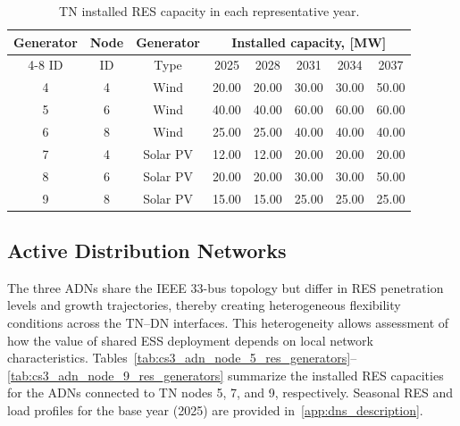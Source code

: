 \documentclass[preprint,12pt]{elsarticle}
\begin{document}
\begin{table}[htbp!]
    \centering
    \caption{TN installed RES capacity in each representative year.}
    \begin{tabular}{ccc ccccc}
        \toprule
        Generator   & Node  & Generator & \multicolumn{5}{c}{Installed capacity, [MW]}\\  \cmidrule{4-8}
        ID          & ID    & Type      & 2025  & 2028  & 2031  & 2034   & 2037 \\ 
        \midrule
        4 & 4 &  Wind     & 20.00 & 20.00 & 30.00 & 30.00 & 50.00\\
        5 & 6 &  Wind     & 40.00 & 40.00 & 60.00 & 60.00 & 60.00\\
        6 & 8 &  Wind     & 25.00 & 25.00 & 40.00 & 40.00 & 40.00\\
        7 & 4 &  Solar PV & 12.00 & 12.00 & 20.00 & 20.00 & 20.00\\
        8 & 6 &  Solar PV & 20.00 & 20.00 & 30.00 & 30.00 & 50.00\\
        9 & 8 &  Solar PV & 15.00 & 15.00 & 25.00 & 25.00 & 25.00\\
        \bottomrule
    \end{tabular}
    \label{tab:cs3_tn_res_generators}
\end{table}

\subsection{Active Distribution Networks}
\label{subsec:case_study_adns}

The three ADNs share the IEEE 33-bus topology but differ in RES penetration levels and growth trajectories, thereby creating heterogeneous flexibility conditions across the TN--DN interfaces. This heterogeneity allows assessment of how the value of shared ESS deployment depends on local network characteristics. Tables~\ref{tab:cs3_adn_node_5_res_generators}--\ref{tab:cs3_adn_node_9_res_generators} summarize the installed RES capacities for the ADNs connected to TN nodes 5, 7, and 9, respectively. Seasonal RES and load profiles for the base year (2025) are provided in~\ref{app:dns_description}.
\end{document}
